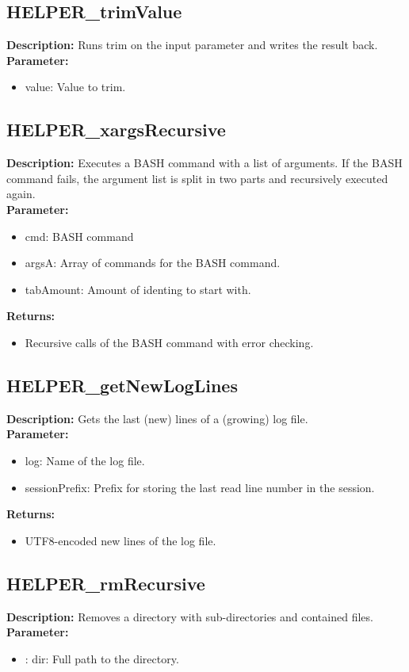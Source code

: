 \subsection{HELPER\_trimValue}
\textbf{Description:} Runs trim on the input parameter and writes the result back.\\
\textbf{Parameter:}
\begin{itemize}
\item value: Value to trim.
\end{itemize}

\subsection{HELPER\_xargsRecursive}
\textbf{Description:} Executes a BASH command with a list of arguments. If the BASH command fails, the argument list is split in two parts and recursively executed again.\\
\textbf{Parameter:}
\begin{itemize}
\item cmd: BASH command
\item argsA: Array of commands for the BASH command.
\item tabAmount: Amount of identing to start with.
\end{itemize}
\textbf{Returns:}
\begin{itemize}
\item Recursive calls of the BASH command with error checking.
\end{itemize}

\subsection{HELPER\_getNewLogLines}
\textbf{Description:} Gets the last (new) lines of a (growing) log file.\\
\textbf{Parameter:}
\begin{itemize}
\item log: Name of the log file.
\item sessionPrefix: Prefix for storing the last read line number in the session.
\end{itemize}
\textbf{Returns:}
\begin{itemize}
\item UTF8-encoded new lines of the log file.
\end{itemize}

\subsection{HELPER\_rmRecursive}
\textbf{Description:} Removes a directory with sub-directories and contained files.\\
\textbf{Parameter:}
\begin{itemize}
\item : dir: Full path to the directory.
\end{itemize}

